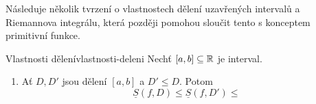 Následuje několik tvrzení o vlastnostech dělení uzavřených intervalů a
Riemannova integrálu, která později pomohou sloučit tento s konceptem primitivní
funkce.

\begin{lemma}{Vlastnosti dělení}{vlastnosti-deleni}
	Nechť $[a,b] \subseteq \mathbb{R}$ je interval.
	\begin{enumerate}[label=(\alph*),topsep=0pt]
		\item Ať $D,D'$ jsou dělení $[a,b]$ a $D' \leq D$. Potom
		      \[
			      \underline{S}(f,D) \leq \underline{S}(f,D') \leq
		      \]
	\end{enumerate}
\end{lemma}
